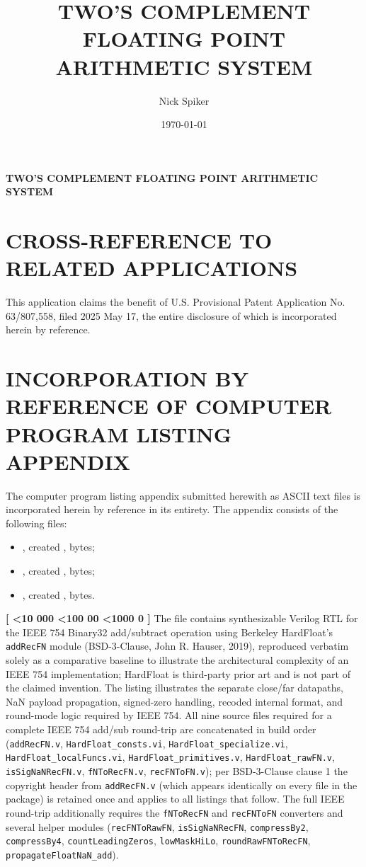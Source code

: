 \documentclass[12pt,letter]{article}
\title{\textbf{TWO'S COMPLEMENT FLOATING POINT ARITHMETIC SYSTEM}}
\author{Nick Spiker}
\date{\today}
\newcounter{paracounter}
\newcommand{\ppara}[1]{
\noindent\textbf{[\formatparanumber{\arabic{paracounter}}]} \begingroup\RaggedRight\sloppy\hbadness=10000 #1\par\endgroup%
\stepcounter{paracounter}%
}
\newcommand{\formatparanumber}[1]{%
\ifnum#1<10 000%
\else\ifnum#1<100 00%
\else\ifnum#1<1000 0%
\fi\fi\fi#1%
}
\begin{document}
\begin{center}
    {\Large \textbf{TWO'S COMPLEMENT FLOATING POINT ARITHMETIC SYSTEM}\par}
\end{center}

\section{CROSS-REFERENCE TO RELATED APPLICATIONS}

This application claims the benefit of U.S. Provisional Patent Application No. 63/807,558, filed 2025 May 17, the entire disclosure of which is incorporated herein by reference.

\section{INCORPORATION BY REFERENCE OF COMPUTER PROGRAM LISTING APPENDIX}

The computer program listing appendix submitted herewith as ASCII text files is incorporated herein by reference in its entirety. The appendix consists of the following files:

\begin{itemize}
    \item \texttt{\cplaHardfloatName}, created \cplaDate, \cplaHardfloatBytes{} bytes;
    \item \texttt{\cplaScalarName}, created \cplaDate, \cplaScalarBytes{} bytes;
    \item \texttt{\cplaCircleName}, created \cplaDate, \cplaCircleBytes{} bytes.
\end{itemize}

\ppara{The file \texttt{\cplaHardfloatName} contains synthesizable Verilog RTL for the IEEE 754 Binary32 add/subtract operation using Berkeley HardFloat's \texttt{addRecFN} module (BSD-3-Clause, John R. Hauser, 2019), reproduced verbatim solely as a comparative baseline to illustrate the architectural complexity of an IEEE 754 implementation; HardFloat is third-party prior art and is not part of the claimed invention. The listing illustrates the separate close/far datapaths, NaN payload propagation, signed-zero handling, recoded internal format, and round-mode logic required by IEEE 754. All nine source files required for a complete IEEE 754 add/sub round-trip are concatenated in build order (\texttt{addRecFN.v}, \texttt{HardFloat\_consts.vi}, \texttt{HardFloat\_specialize.vi}, \texttt{HardFloat\_localFuncs.vi}, \texttt{HardFloat\_primitives.v}, \texttt{HardFloat\_rawFN.v}, \texttt{isSigNaNRecFN.v}, \texttt{fNToRecFN.v}, \texttt{recFNToFN.v}); per BSD-3-Clause clause 1 the copyright header from \texttt{addRecFN.v} (which appears identically on every file in the package) is retained once and applies to all listings that follow. The full IEEE round-trip additionally requires the \texttt{fNToRecFN} and \texttt{recFNToFN} converters and several helper modules (\texttt{recFNToRawFN}, \texttt{isSigNaNRecFN}, \texttt{compressBy2}, \texttt{compressBy4}, \texttt{countLeadingZeros}, \texttt{lowMaskHiLo}, \texttt{roundRawFNToRecFN}, \texttt{propagateFloatNaN\_add}).}
\end{document}
